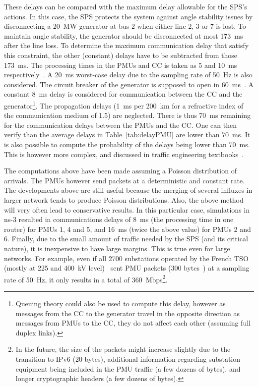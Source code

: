 These delays can be compared with the maximum delay allowable for the SPS's actions. In this case, the SPS protects the system against angle stability issues by disconnecting a 20~MW generator at bus 2 when either line 2, 3 or 7 is lost. To maintain angle stability, the generator should be disconnected at most 173~ms after the line loss. To determine the maximum communication delay that satisfy this constraint, the other (constant) delays have to be subtracted from those 173~ms. The processing times in the PMUs and CC is taken as 5 and 10~ms respectively~\cite{SPS-Ciapessoni}. A 20~ms worst-case delay due to the sampling rate of 50~Hz is also considered. The circuit breaker of the generator is supposed to open in 60~ms~\cite{ESOcircuitBreakerDelay}. A constant 8~ms delay is considered for communication between the CC and the generator\footnote{Queuing theory could also be used to compute this delay, however as messages from the CC to the generator travel in the opposite direction as messages from PMUs to the CC, they do not affect each other (assuming full duplex links).}. The propagation delays (1~ms per 200~km for a refractive index of the communication medium of 1.5) are neglected. There is thus 70~ms remaining for the communication delays between the PMUs and the CC. One can then verify than the average delays in Table~\ref{tab:delayPMU} are lower than 70~ms. It is also possible to compute the probability of the delays being lower than 70~ms. This is however more complex, and discussed in traffic engineering textbooks~\cite{trafficBook}.

The computations above have been made assuming a Poisson distribution of arrivals. The PMUs however send packets at a deterministic and constant rate. The developments above are still useful because the merging of several influxes in larger network tends to produce Poisson distributions. Also, the above method will very often lead to conservative results. In this particular case, simulations in ns-3 resulted in communications delays of 8~ms (the processing time in one router) for PMUs 1, 4 and 5, and 16~ms (twice the above value) for PMUs 2 and 6. Finally, due to the small amount of traffic needed by the SPS (and its critical nature), it is inexpensive to have large margins. This is true even for large networks. For example, even if all 2700 substations operated by the French TSO (mostly at 225 and 400~kV level)~\cite{RTEsubstations} sent PMU packets (300 bytes~\cite{StandardC37-118-2}) at a sampling rate of 50~Hz, it only results in a total of 360~Mbps\footnote{In the future, the size of the packets might increase slightly due to the transition to IPv6 (20 bytes), additional information regarding substation equipment being included in the PMU traffic (a few dozens of bytes), and longer cryptographic headers (a few dozens of bytes).}.

